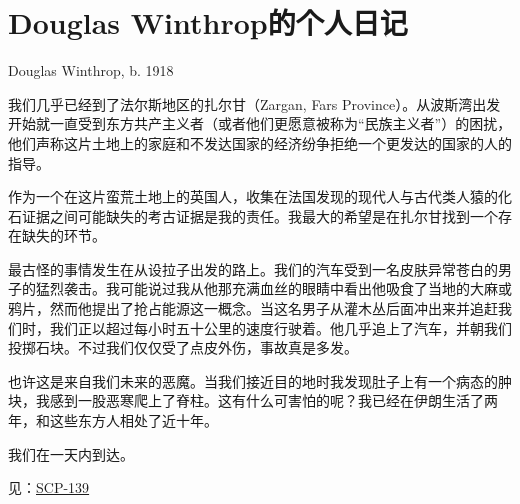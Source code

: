 \section{Douglas Winthrop的个人日记}

\label{sec:DOC-personal-journal-of-douglas-winthrop}

Douglas Winthrop, b. 1918


我们几乎已经到了法尔斯地区的扎尔甘（Zargan, Fars Province）。从波斯湾出发开始就一直受到东方共产主义者（或者他们更愿意被称为“民族主义者”）的困扰，他们声称这片土地上的家庭和不发达国家的经济纷争拒绝一个更发达的国家的人的指导。

作为一个在这片蛮荒土地上的英国人，收集在法国发现的现代人与古代类人猿的化石证据之间可能缺失的考古证据是我的责任。我最大的希望是在扎尔甘找到一个存在缺失的环节。

最古怪的事情发生在从设拉子出发的路上。我们的汽车受到一名皮肤异常苍白的男子的猛烈袭击。我可能说过我从他那充满血丝的眼睛中看出他吸食了当地的大麻或鸦片，然而他提出了抢占能源这一概念。当这名男子从灌木丛后面冲出来并追赶我们时，我们正以超过每小时五十公里的速度行驶着。他几乎追上了汽车，并朝我们投掷石块。不过我们仅仅受了点皮外伤，事故真是多发。

也许这是来自我们未来的恶魔。当我们接近目的地时我发现肚子上有一个病态的肿块，我感到一股恶寒爬上了脊柱。这有什么可害怕的呢？我已经在伊朗生活了两年，和这些东方人相处了近十年。

我们在一天内到达。

见：\hyperref[chap:SCP-139]{SCP-139}
